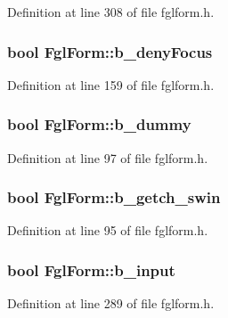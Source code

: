 Definition at line 308 of file fglform.h.

\hypertarget{classFglForm_a99b822401e45535d412f2a6c5601734d}{
\subsubsection[{b\_\-denyFocus}]{\setlength{\rightskip}{0pt plus 5cm}bool {\bf FglForm::b\_\-denyFocus}}}
\label{classFglForm_a99b822401e45535d412f2a6c5601734d}


Definition at line 159 of file fglform.h.

\hypertarget{classFglForm_a4dd283ca13e8a699e88783b2946b6841}{
\subsubsection[{b\_\-dummy}]{\setlength{\rightskip}{0pt plus 5cm}bool {\bf FglForm::b\_\-dummy}}}
\label{classFglForm_a4dd283ca13e8a699e88783b2946b6841}


Definition at line 97 of file fglform.h.

\hypertarget{classFglForm_ac6325d19f253fe4e7cdfbd50bd027c19}{
\subsubsection[{b\_\-getch\_\-swin}]{\setlength{\rightskip}{0pt plus 5cm}bool {\bf FglForm::b\_\-getch\_\-swin}}}
\label{classFglForm_ac6325d19f253fe4e7cdfbd50bd027c19}


Definition at line 95 of file fglform.h.

\hypertarget{classFglForm_a348ba4d61a2c9e18513ac88c919015c0}{
\subsubsection[{b\_\-input}]{\setlength{\rightskip}{0pt plus 5cm}bool {\bf FglForm::b\_\-input}}}
\label{classFglForm_a348ba4d61a2c9e18513ac88c919015c0}


Definition at line 289 of file fglform.h.

